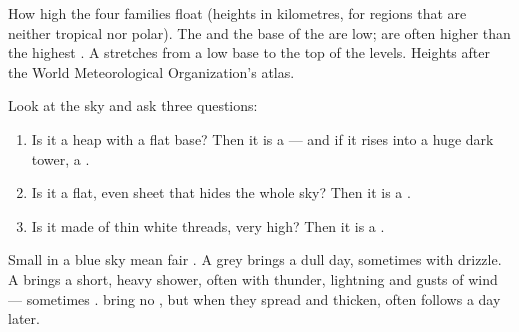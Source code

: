 \begin{omfigure}
{\small How high the four  families float (heights in kilometres, for
regions that are neither tropical nor polar). The  and the base of
the  are low;  are often higher than the highest . A
 stretches from a low base to the top of the  levels.
Heights after the World Meteorological Organization's  atlas.}
\label{fig:g4:clouds-rain-snow:heights}
\end{omfigure}

\begin{method}\label{met:g4:clouds-rain-snow:naming}
Look at the sky and ask three questions:
\begin{enumerate}
  \item Is it a heap with a flat base? Then it is a  --- and if it
        rises into a huge dark tower, a .
  \item Is it a flat, even sheet that hides the whole sky? Then it is a
        .
  \item Is it made of thin white threads, very high? Then it is a .
\end{enumerate}
\end{method}

\begin{remark}\label{rem:g4:clouds-rain-snow:tell}
Small  in a blue sky mean fair . A grey  brings a dull
day, sometimes with drizzle. A  brings a short, heavy shower,
often with thunder, lightning and gusts of wind --- sometimes . 
bring no , but when they spread and thicken,  often follows a day
later.
\end{remark}

